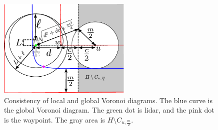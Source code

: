 \begin{figure}
\centering
\includegraphics[width=2.5in]{Figures/voronoi-proof-shadow-distant.pdf}
\caption{Consistency of local and global Voronoi diagrams. The blue curve is the global Voronoi diagram. The green dot is lidar, and the pink dot is the waypoint. The gray area is $H\setminus C_{u, \frac{m}{2}}$. }
\label{fig:voronoi-proof}
\end{figure}








